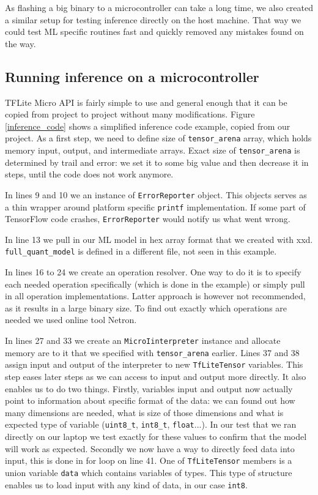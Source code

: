 As flashing a big binary to a microcontroller can take a long time, we also created a similar setup for testing inference directly on the host machine.
That way we could test ML specific routines fast and quickly removed any mistakes found on the way.


\subsection{ Running inference on a microcontroller}

TFLite Micro API is fairly simple to use and general enough that it can be copied from project to project without many modifications.
Figure \ref{inference_code} shows a simplified inference code example, copied from our project.
As a first step, we need to define size of \verb|tensor_arena| array, which holds memory input, output, and intermediate arrays.
Exact size of \verb|tensor_arena| is determined by trail and error: we set it to some big value and then decrease it in steps, until the code does not work anymore.

In lines 9 and 10 we an instance of \verb|ErrorReporter| object.
This objects serves as a thin wrapper around platform specific \verb|printf| implementation.
If some part of TensorFlow code crashes, \verb|ErrorReporter| would notify us what went wrong.

In line 13 we pull in our ML model in hex array format that we created with xxd.
\verb|full_quant_model| is defined in a different file, not seen in this example.

In lines 16 to 24 we create an operation resolver.
One way to do it is to specify each needed operation specifically (which is done in the example) or simply pull in all operation implementations.
Latter approach is however not recommended, as it results in a large binary size.
To find out exactly which operations are needed we used online tool Netron\cite{netron}.

In lines 27 and 33 we create an \verb|MicroIinterpreter| instance and allocate memory are to it that we specified with \verb|tensor_arena| earlier.
Lines 37 and 38 assign input and output of the interpreter to new \verb|TfLiteTensor| variables.
This step eases later steps as we can access to input and output more directly.
It also enables us to do two things.
Firstly, variables input and output now actually point to information about specific format of the data: we can found out how many dimensions are needed, what is size of those dimensions and what is expected type of variable (\verb|uint8_t|, \verb|int8_t|, \verb|float|...).
In our test that we ran directly on our laptop we test exactly for these values to confirm that the model will work as expected.
Secondly we now have a way to directly feed data into input, this is done in for loop on line 41.
One of \verb|TfLiteTensor| members is a union variable \verb|data| which contains variables of types.
This type of structure enables us to load input with any kind of data, in our case \verb|int8|.

